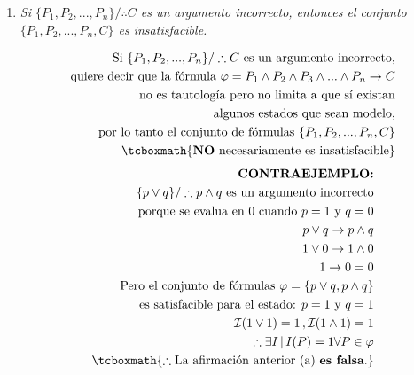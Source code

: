 \documentclass[11pt,letterpaper]{article}
\begin{document}
\begin{enumerate}
            \begin{enumerate}
                \item \textit{Si $\{P_1,P_2,...,P_n\}/\therefore C$ es un argumento
                incorrecto, entonces el conjunto $\{P_1,P_2,...,P_n,C\}$ es insatisfacible.}

                    \begin{equation*} \begin{split}
                        \text{Si } \{P_1,P_2,...,P_n\}/\therefore C \text{ es un argumento incorrecto,} \\
                        \text{quiere decir que la fórmula } \varphi = P_1 \land P_2 \land P_3 \land ... \land P_n \rightarrow C \\
                        \text{no es tautología pero no limita a que sí existan} \\
                        \text{algunos estados que sean modelo,} \\
                        \text{por lo tanto el conjunto de fórmulas } \{P_1,P_2,...,P_n,C\} \\
                        \tcboxmath{\text{\textbf{NO} necesariamente es insatisfacible}}
                    \end{split} \end{equation*}
                    \bigskip
                    \begin{equation*} \begin{split}
                        \text{\textbf{CONTRAEJEMPLO:}} \\
                         \{p \lor q\} / \therefore p \land q \text{ es un argumento incorrecto} \\
                        \text{ porque se evalua en 0 cuando } p = 1 \text{ y } q = 0\\
                        p \lor q \rightarrow p \land q \\
                        1 \lor 0 \rightarrow 1 \land 0 \\
                        1 \rightarrow 0 = 0 \\
                        \text{Pero el conjunto de fórmulas } \varphi = \{ p \lor q , p \land q \} \\
                        \text{es satisfacible para el estado: } p = 1 \text{ y } q = 1\\
                        \mathcal{I}(1 \lor 1) = 1 \, , \mathcal{I}(1 \land 1) = 1 \\
                        \therefore \exists I \, | \, I(P) = 1 \forall P \in \varphi \\
                        \tcboxmath{\therefore \text{La afirmación anterior (a) \textbf{es falsa}.}} \\
                    \end{split} \end{equation*}

            \end{enumerate}
\end{enumerate}
\end{document}
